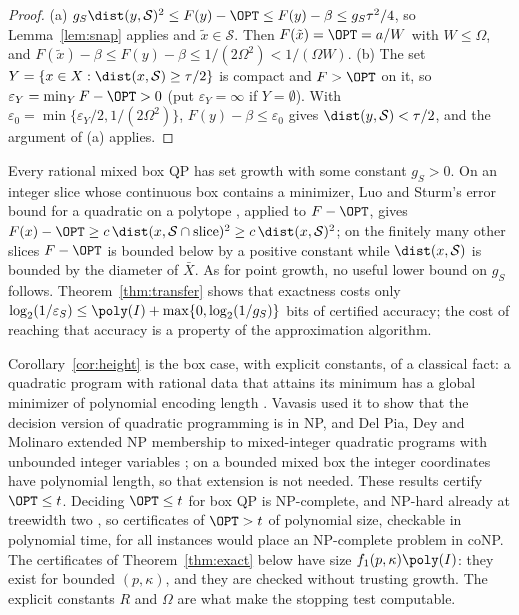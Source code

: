 \begin{proof}
(a) $g_S\dist(y,\mathcal S)^2\le F(y)-\OPT\le F(y)-\beta\le g_S\tau^2/4$, so
Lemma~\ref{lem:snap} applies and $\tilde x\in\mathcal S$. Then
$F(\tilde x)=\OPT=a/W$ with $W\le \Omega$, and
$F(\tilde x)-\beta\le F(y)-\beta\le1/(2\Omega^2)<1/(\Omega W)$.
(b) The set $Y=\{x\in X:\dist(x,\mathcal S)\ge\tau/2\}$ is compact and
$F>\OPT$ on it, so $\varepsilon_Y=\min_YF-\OPT>0$ (put $\varepsilon_Y=\infty$
if $Y=\emptyset$). With $\varepsilon_0=\min\{\varepsilon_Y/2,1/(2\Omega^2)\}$,
$F(y)-\beta\le\varepsilon_0$ gives $\dist(y,\mathcal S)<\tau/2$, and the
argument of (a) applies.
\end{proof}

\begin{remark}\label{rem:setgrowth}
Every rational mixed box QP has set growth with some constant $g_S>0$. On an
integer slice whose continuous box contains a minimizer, Luo and Sturm's error
bound for a quadratic on a polytope \cite[Theorem~3.3]{LuoSturm2000}, applied
to $F-\OPT$, gives
$F(x)-\OPT\ge c\,\dist(x,\mathcal S\cap\text{slice})^2\ge c\,\dist(x,\mathcal S)^2$;
on the finitely many other slices $F-\OPT$ is bounded below by a positive
constant while $\dist(x,\mathcal S)$ is bounded by the diameter of $\bar X$.
As for point growth, no useful lower bound on $g_S$ follows.
Theorem~\ref{thm:transfer} shows that exactness costs only
$\log_2(1/\varepsilon_S)\le\poly(I)+\max\{0,\log_2(1/g_S)\}$ bits of
certified accuracy; the cost of reaching that accuracy is a property of the
approximation algorithm.
\end{remark}

\begin{remark}\label{rem:np}
Corollary~\ref{cor:height} is the box case, with explicit constants, of a
classical fact: a quadratic program with rational data that attains its
minimum has a global minimizer of polynomial encoding length
\cite{Vavasis1990}. Vavasis used it to show that the decision version of
quadratic programming is in NP, and Del Pia, Dey and Molinaro extended NP
membership to mixed-integer quadratic programs with unbounded integer
variables \cite{DelPiaDeyMolinaro2017}; on a bounded mixed box the integer
coordinates have polynomial length, so that extension is not needed. These
results certify $\OPT\le t$. Deciding $\OPT\le t$ for box QP is NP-complete,
and NP-hard already at treewidth two \cite{DelPiaKhajavirad2026}, so
certificates of $\OPT>t$ of polynomial size, checkable in polynomial time, for
all instances would place an NP-complete problem in coNP. The certificates of
Theorem~\ref{thm:exact} below have size $f_1(p,\kappa)\poly(I)$: they exist
for bounded $(p,\kappa)$, and they are checked without trusting growth. The
explicit constants $R$ and $\Omega$ are what make the stopping test
computable.
\end{remark}

